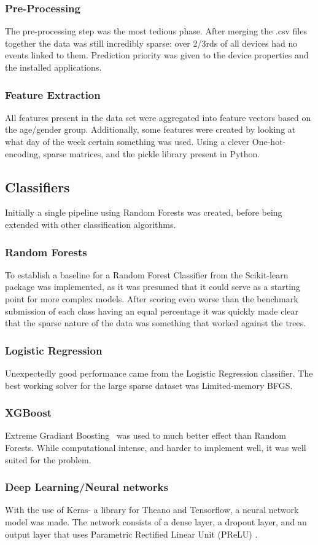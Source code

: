\documentclass[runningheads,a4paper]{llncs}
\begin{document}
\subsubsection{Pre-Processing}
The pre-processing step was the most tedious phase. After merging the .csv files together the data was still incredibly sparse: over 2/3rds of all devices had no events linked to them. Prediction priority was given to the device properties and the installed applications.
\subsubsection{Feature Extraction}
All features present in the data set were aggregated into feature vectors based on the age/gender group. Additionally, some features were created by looking at what day of the week certain something was used. Using a clever One-hot-encoding, sparse matrices, and the pickle library present in Python. 
\subsection{Classifiers}
Initially a single pipeline using Random Forests was created, before being extended with other classification algorithms. 
\subsubsection{Random Forests}
To establish a baseline for a Random Forest Classifier from the Scikit-learn package was implemented, as it was presumed that it could serve as a starting point for more complex models. After scoring even worse than the benchmark submission of each class having an equal percentage it was quickly made clear that the sparse nature of the data was something that worked against the trees.
\subsubsection{Logistic Regression}
Unexpectedly good performance came from the Logistic Regression classifier. The best working solver for the large sparse dataset was Limited-memory BFGS. 
\subsubsection{XGBoost}
Extreme Gradiant Boosting~\cite{CT2015} was used to much better effect than Random Forests. While computational intense, and harder to implement well, it was well suited for the problem. \medskip
\subsubsection{Deep Learning/Neural networks}
With the use of Keras-  a library for Theano and Tensorflow, a neural network model was made. The network consists of a dense layer, a dropout layer, and an output layer that uses Parametric Rectified Linear Unit (PReLU) \cite{PReLU}. 
\end{document}
